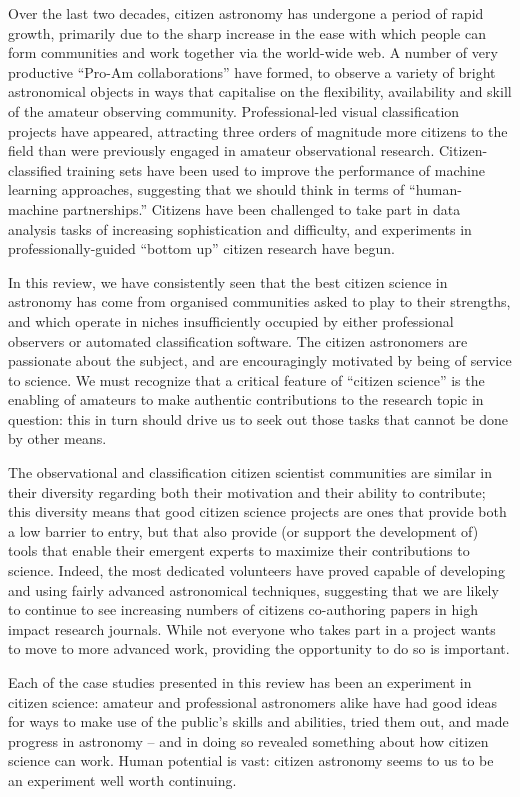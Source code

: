 \documentclass{ar2e}
\begin{document}
Over the last two decades, citizen astronomy has undergone a period of rapid
growth, primarily due to the sharp increase in the ease with which people can
form communities and work together via the world-wide web.   A number of very
productive ``Pro-Am collaborations'' have formed, to observe a variety of bright
astronomical objects in ways that capitalise on the flexibility, availability
and skill of the amateur observing community. Professional-led visual
classification projects have appeared, attracting three orders of magnitude more
citizens to the field than were previously engaged in amateur observational
research. Citizen-classified training sets have been used to improve the
performance of  machine learning approaches, suggesting that we should think in
terms of ``human-machine partnerships.'' Citizens have been challenged to take
part in data analysis tasks of increasing sophistication and difficulty, and
experiments in professionally-guided ``bottom up'' citizen research have begun.

In this review, we have consistently seen that the best citizen science in
astronomy has come from organised communities asked to play to their strengths,
and which operate in niches insufficiently occupied by either professional observers or
automated classification software. The citizen astronomers are passionate about
the subject, and are encouragingly motivated by being of service to science. We must recognize
that a critical feature of ``citizen science'' is the enabling of amateurs to
make authentic contributions to the research topic in question: this in turn
should drive us to seek out those  tasks that cannot be done by other means. 

The observational and classification citizen scientist communities are similar
in their diversity regarding both their motivation and their ability to
contribute;  this diversity means that good citizen science projects are ones
that provide both a low barrier to entry, but that also provide (or support the
development of) tools that enable their emergent experts to maximize their
contributions to science.  Indeed, the most dedicated volunteers have proved
capable of developing and using fairly advanced astronomical techniques,
suggesting that we are likely to continue to see increasing numbers of citizens
co-authoring papers in high impact research journals. While not everyone who
takes part in a project wants to move to more advanced work, providing the
opportunity to do so is important.

Each of the case studies presented in this review has been an experiment in
citizen science: amateur and professional astronomers alike have had good ideas
for ways to make use of the public's skills and abilities, tried them out, and 
made progress in astronomy -- and in doing so revealed something about how
citizen science can work. Human potential is vast: citizen astronomy seems to us
to be an experiment well worth continuing. 
\end{document}
